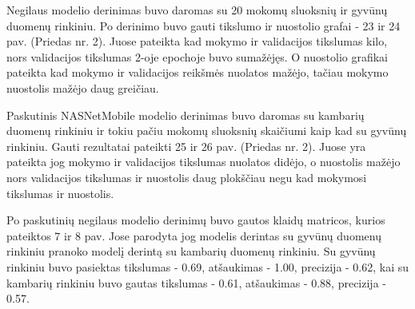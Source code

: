 \documentclass{VUMIFPSbakalaurinis}
\begin{document}
Negilaus modelio derinimas buvo daromas su 20 mokomų sluoksnių ir gyvūnų duomenų rinkiniu.
Po derinimo buvo gauti tikslumo ir nuostolio grafai - 23 ir 24 pav. (Priedas nr. 2). Juose pateikta kad mokymo ir validacijos tikslumas kilo, nors validacijos tikslumas 2-oje epochoje buvo sumažėjęs. O nuostolio grafikai pateikta kad mokymo ir validacijos reikšmės nuolatos mažėjo, tačiau mokymo nuostolis mažėjo daug greičiau.

Paskutinis NASNetMobile modelio derinimas buvo daromas su kambarių duomenų rinkiniu ir tokiu pačiu mokomų sluoksnių skaičiumi kaip kad su gyvūnų rinkiniu. 
Gauti rezultatai pateikti 25 ir 26 pav. (Priedas nr. 2). Juose yra pateikta jog mokymo ir validacijos tikslumas nuolatos didėjo, o nuostolis mažėjo nors validacijos tikslumas ir nuostolis daug plokščiau negu kad mokymosi tikslumas ir nuostolis.

Po paskutinių negilaus modelio derinimų buvo gautos klaidų matricos, kurios pateiktos 7 ir 8 pav. Jose parodyta jog modelis derintas su gyvūnų duomenų rinkiniu pranoko modelį derintą su kambarių duomenų rinkiniu.
Su gyvūnų rinkiniu buvo pasiektas tikslumas - 0.69, atšaukimas - 1.00, precizija - 0.62, kai su kambarių rinkiniu buvo gautas tikslumas - 0.61, atšaukimas - 0.88, precizija - 0.57.
\end{document}
